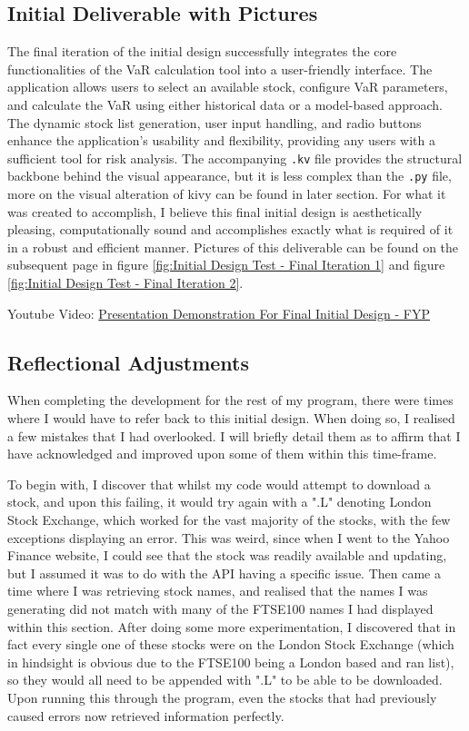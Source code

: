 \documentclass{article}
\begin{document}
\subsection{Initial Deliverable with Pictures}
The final iteration of the initial design successfully integrates the core functionalities of the VaR calculation tool into a user-friendly interface. The application allows users to select an available stock, configure VaR parameters, and calculate the VaR using either historical data or a model-based approach. The dynamic stock list generation, user input handling, and radio buttons enhance the application's usability and flexibility, providing any users with a sufficient tool for risk analysis. The accompanying \texttt{.kv} file provides the structural backbone behind the visual appearance, but it is less complex than the \texttt{.py} file, more on the visual alteration of kivy can be found in later section. For what it was created to accomplish, I believe this final initial design is aesthetically pleasing, computationally sound and accomplishes exactly what is required of it in a robust and efficient manner. Pictures of this deliverable can be found on the subsequent page in figure \ref{fig:Initial Design Test - Final Iteration 1} and figure \ref{fig:Initial Design Test - Final Iteration 2}.



Youtube Video: \href{https://youtu.be/2GIWug_IESI}{Presentation Demonstration For Final Initial Design - FYP}

\subsection{Reflectional Adjustments}
When completing the development for the rest of my program, there were times where I would have to refer back to this initial design. When doing so, I realised a few mistakes that I had overlooked. I will briefly detail them as to affirm that I have acknowledged and improved upon some of them within this time-frame.\\\vspace{0.3cm}

To begin with, I discover that whilst my code would attempt to download a stock, and upon this failing, it would try again with a ".L" denoting London Stock Exchange, which worked for the vast majority of the stocks, with the few exceptions displaying an error. This was weird, since when I went to the Yahoo Finance website, I could see that the stock was readily available and updating, but I assumed it was to do with the API having a specific issue. Then came a time where I was retrieving stock names, and realised that the names I was generating did not match with many of the FTSE100 names I had displayed within this section. After doing some more experimentation, I discovered that in fact every single one of these stocks were on the London Stock Exchange (which in hindsight is obvious due to the FTSE100 being a London based and ran list), so they would all need to be appended with ".L" to be able to be downloaded. Upon running this through the program, even the stocks that had previously caused errors now retrieved information perfectly.\\\vspace{0.3cm}
\end{document}
